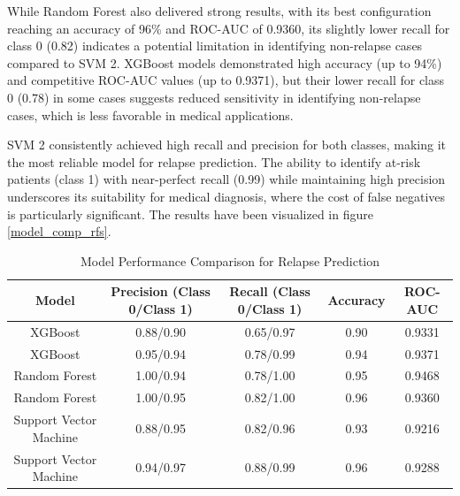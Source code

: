 \documentclass[conference]{IEEEtran}
\begin{document}
While Random Forest also delivered strong results, with its best configuration reaching an accuracy of 96\% and ROC-AUC of 0.9360, its slightly lower recall for class 0 (0.82) indicates a potential limitation in identifying non-relapse cases compared to SVM 2. XGBoost models demonstrated high accuracy (up to 94\%) and competitive ROC-AUC values (up to 0.9371), but their lower recall for class 0 (0.78) in some cases suggests reduced sensitivity in identifying non-relapse cases, which is less favorable in medical applications.

SVM 2 consistently achieved high recall and precision for both classes, making it the most reliable model for relapse prediction. The ability to identify at-risk patients (class 1) with near-perfect recall (0.99) while maintaining high precision underscores its suitability for medical diagnosis, where the cost of false negatives is particularly significant. The results have been visualized in figure \ref{model_comp_rfs}.

\begin{table}[t]
\centering
\caption{Model Performance Comparison for Relapse Prediction}
\begin{tabular}{|c|c|c|c|c|}
\hline
\textbf{Model}                 & \textbf{Precision (Class 0/Class 1)} & \textbf{Recall (Class 0/Class 1)} & \textbf{Accuracy} & \textbf{ROC-AUC} \\ \hline
XGBoost                        & 0.88/0.90                           & 0.65/0.97                        & 0.90              & 0.9331           \\ \hline
XGBoost                        & 0.95/0.94                           & 0.78/0.99                        & 0.94              & 0.9371           \\ \hline
Random Forest                  & 1.00/0.94                           & 0.78/1.00                        & 0.95              & 0.9468           \\ \hline
Random Forest                  & 1.00/0.95                           & 0.82/1.00                        & 0.96              & 0.9360           \\ \hline
Support Vector Machine         & 0.88/0.95                           & 0.82/0.96                        & 0.93              & 0.9216           \\ \hline
Support Vector Machine         & 0.94/0.97                           & 0.88/0.99                        & 0.96              & 0.9288           \\ \hline
\end{tabular}
\label{RFS_model_eval}
\end{table}
\end{document}
